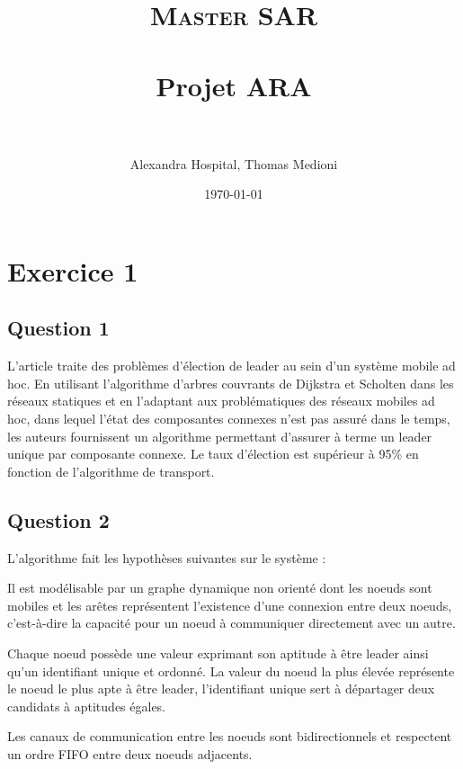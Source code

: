 \documentclass[paper=a4, fontsize=11pt]{article} %
\title{	
\normalfont \normalsize 
\textsc{Master SAR} \\ [25pt] %
\horrule{0.5pt} \\[0.4cm] %
\huge Projet ARA \\ %
\horrule{2pt} \\[0.5cm] %
}
\author{Alexandra Hospital, Thomas Medioni} %
\date{\normalsize\today} %
\begin{document}
\maketitle %

\newpage


\section{Exercice 1}

\subsection{Question 1}

L'article traite des problèmes d'élection de leader au sein d'un système mobile ad hoc. En utilisant l'algorithme d'arbres couvrants de Dijkstra et Scholten dans les réseaux statiques et en l'adaptant aux problématiques des réseaux mobiles ad hoc, dans lequel l'état des composantes connexes n'est pas assuré dans le temps, les auteurs fournissent un algorithme permettant d'assurer à terme un leader unique par composante connexe.
Le taux d'élection est supérieur à 95\% en fonction de l'algorithme de transport.

\subsection{Question 2}

L'algorithme fait les hypothèses suivantes sur le système :

Il est modélisable par un graphe dynamique non orienté dont les noeuds sont mobiles et les arêtes représentent l'existence d'une connexion entre deux noeuds, c'est-à-dire la capacité pour un noeud à communiquer directement avec un autre.

Chaque noeud possède une valeur exprimant son aptitude à être leader ainsi qu'un identifiant unique et ordonné. La valeur du noeud la plus élevée représente le noeud le plus apte à être leader, l'identifiant unique sert à départager deux candidats à aptitudes égales.

Les canaux de communication entre les noeuds sont bidirectionnels et respectent un ordre FIFO entre deux noeuds adjacents.
\end{document}
